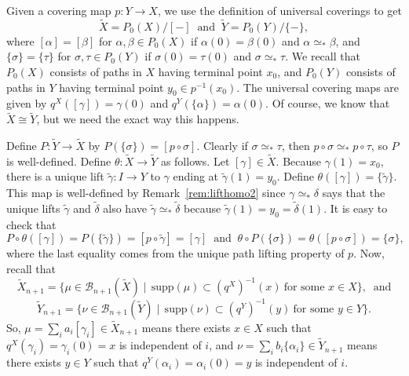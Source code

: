 \documentclass[amscd,amssymb,verbatim,11pt]{amsart}
\theoremstyle{plain}
\theoremstyle{definition}
\def\scr{\mathcal}
\def\B{{\scr B}}
\begin{document}
Given a covering map $p:Y\to X$, we use the definition of universal coverings to get
\[
\widetilde X = P_0(X)/[-]\ \text{ and }\ \widetilde Y = P_0(Y)/\{-\},
\]
where $[\alpha]=[\beta]$ for $\alpha,\beta\in P_0(X)$ if $\alpha(0)=\beta(0)$ and $\alpha\simeq_* \beta$, and $\{\sigma\}
=\{\tau\}$ for $\sigma,\tau \in P_0(Y)$ if $\sigma(0)=\tau(0)$ and $\sigma\simeq_* \tau$. We recall that $P_0(X)$ consists of paths in $X$ having terminal point $x_0$, and $P_0(Y)$ consists of paths in $Y$ having terminal point $y_0\in p^{-1}(x_0)$. The universal covering maps are given by $q^X([\gamma])=\gamma(0)$ and $q^Y(\{\alpha\})=\alpha(0)$. Of course, we know that $\widetilde X \cong \widetilde Y$, but we need the exact way this happens.

Define $P\colon \widetilde Y \to \widetilde X$ by $P(\{\sigma\}) = [p\circ\sigma]$. Clearly if
$\sigma\simeq_*\tau$, then $p\circ\sigma\simeq_* p\circ\tau$, so $P$ is well-defined.
Define $\theta\colon \widetilde X \to \widetilde Y$ as follows. Let $[\gamma]\in \widetilde X$. Because $\gamma(1)=x_0$, there is a unique lift $\widetilde\gamma\colon I \to Y$ to $\gamma$ ending at
$\widetilde\gamma(1)=y_0$. Define $\theta([\gamma])=\{\widetilde\gamma\}$. This map is well-defined
by Remark~\ref{rem:lifthomo2} since $\gamma \simeq_* \delta$ says that the unique 
lifts $\widetilde\gamma$
and $\widetilde \delta$ also have $\widetilde\gamma \simeq_* \widetilde\delta$ because $\widetilde\gamma(1) = y_0 =
\widetilde\delta(1)$. It is easy to check that
\[
P\circ\theta([\gamma])  = P(\{\widetilde\gamma\}) = [p\circ\widetilde\gamma]  = [\gamma] \ \text{ and } \
\theta\circ P(\{\sigma\}) = \theta([p\circ\sigma]) = \{\sigma\},
\]
where the last equality comes from the unique path lifting property of $p$. Now, recall that 
\[
\widetilde X_{n+1} = \{\mu \in \B_{n+1}(\widetilde X) \mid\, \text{supp}(\mu) \subset (q^X)^{-1}(x)\
\text{for\ some\ } x\in X\}, \ \text{ and}
\]
\[
\widetilde Y_{n+1} = \{\nu \in \B_{n+1}(\widetilde Y) \mid\, \text{supp}(\nu) \subset (q^Y)^{-1}(y)\
\text{for\ some\ } y\in Y\}.
\]
So, $\mu = \sum_i a_i [\gamma_i] \in \widetilde{X}_{n+1}$ means there exists $x\in X$ such that $q^X(\gamma_i)=\gamma_i(0)=x$ is independent of $i$, and $\nu=\sum_i b_i \{\alpha_i\} \in \widetilde{Y}_{n+1}$ means there exists $y\in Y$ such that $q^Y(\alpha_i)=\alpha_i(0)=y$ is independent of $i$.

\end{document}
